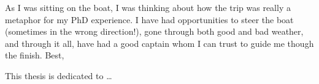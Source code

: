 \begin{frontmatter}

\maketitle

\begin{abstract}

Abstract goes here.

\vspace{1cm}

\noindent Primary Reader: Ernst Niebur\\
Secondary Reader: R{\"u}diger von der Heydt

\end{abstract}

\begin{acknowledgment}

As I was sitting on the boat, I was thinking about how the trip was really a metaphor for my PhD experience. I have had opportunities to steer the boat (sometimes in the wrong direction!), gone through both good and bad weather, and through it all, have had a good captain whom I can trust to guide me though the finish. Best,

\end{acknowledgment}

\begin{dedication}
 
This thesis is dedicated to \ldots

\end{dedication}

\tableofcontents

\listoftables

\listoffigures

\end{frontmatter}

